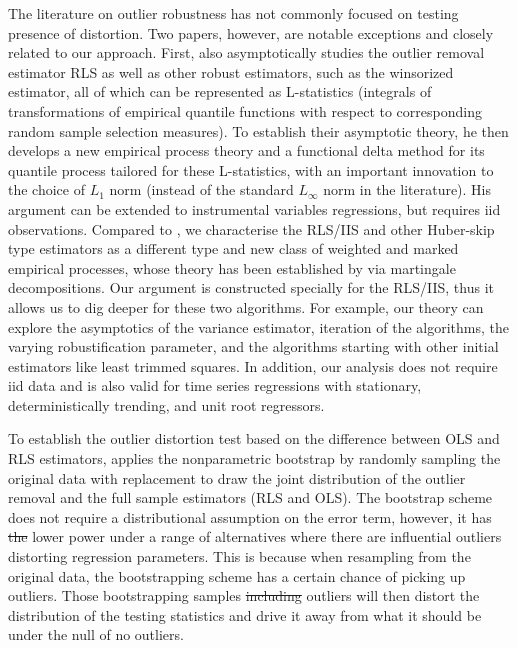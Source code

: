 \documentclass[11pt, letterpaper]{article}
\numberwithin{algorithm}{section}
\numberwithin{assumption}{section}
\numberwithin{lemma}{section}
\numberwithin{theorem}{section}
\numberwithin{corollary}{section}
\numberwithin{remark}{section}
\numberwithin{equation}{section}
\numberwithin{figure}{section}
\numberwithin{table}{section}
\providecommand{\DIFadd}[1]{{\protect\color{blue}\uwave{#1}}} %
\providecommand{\DIFdel}[1]{{\protect\color{red}\sout{#1}}}                      %
\providecommand{\DIFaddbegin}{} %
\providecommand{\DIFaddend}{} %
\providecommand{\DIFdelbegin}{} %
\providecommand{\DIFdelend}{} %
\newcommand{\DIFscaledelfig}{0.5}
\newlength{\DIFdelgraphicswidth} %
\newlength{\DIFdelgraphicsheight} %
\newcommand{\DIFaddincludegraphics}[2][]{{\color{blue}\fbox{\DIFOincludegraphics[#1]{#2}}}} %
\newcommand{\DIFdelincludegraphics}[2][]{%
\sbox{\DIFdelgraphicsbox}{\DIFOincludegraphics[#1]{#2}}%
\settoboxwidth{\DIFdelgraphicswidth}{\DIFdelgraphicsbox} %
\settoboxtotalheight{\DIFdelgraphicsheight}{\DIFdelgraphicsbox} %
\scalebox{\DIFscaledelfig}{%
\parbox[b]{\DIFdelgraphicswidth}{\usebox{\DIFdelgraphicsbox}\\[-\baselineskip] \rule{\DIFdelgraphicswidth}{0em}}\llap{\resizebox{\DIFdelgraphicswidth}{\DIFdelgraphicsheight}{%
\setlength{\unitlength}{\DIFdelgraphicswidth}%
\begin{picture}(1,1)%
\thicklines\linethickness{2pt} %
{\color[rgb]{1,0,0}\put(0,0){\framebox(1,1){}}}%
{\color[rgb]{1,0,0}\put(0,0){\line( 1,1){1}}}%
{\color[rgb]{1,0,0}\put(0,1){\line(1,-1){1}}}%
\end{picture}%
}\hspace*{3pt}}} %
} %
\DeclareRobustCommand{\DIFaddbegin}{\DIFOaddbegin \let\includegraphics\DIFaddincludegraphics} %
\DeclareRobustCommand{\DIFaddend}{\DIFOaddend \let\includegraphics\DIFOincludegraphics} %
\DeclareRobustCommand{\DIFdelbegin}{\DIFOdelbegin \let\includegraphics\DIFdelincludegraphics} %
\DeclareRobustCommand{\DIFdelend}{\DIFOaddend \let\includegraphics\DIFOincludegraphics} %
\begin{document}
The literature on outlier robustness has not commonly focused on testing presence of distortion. Two papers, however, are notable exceptions and closely related to our approach. First, \cite{kaji2018switching} also asymptotically studies the outlier removal estimator RLS as well as other robust estimators, such as the winsorized estimator, all of which can be represented as L-statistics (integrals of transformations of empirical quantile functions with respect to corresponding random sample selection measures). To establish their asymptotic theory, he then develops a new empirical process theory and a functional delta method for its quantile process tailored for these L-statistics, with an important innovation to the choice of $L_{1}$ norm (instead of the standard $L_{\infty}$ norm in the literature). His argument can be extended to instrumental variables regressions, but requires iid observations. Compared to \cite{kaji2018switching}, we characterise the RLS/IIS and other Huber-skip type estimators as a different type and new class of weighted and marked empirical processes, whose theory has been established by \cite{berenguer2019analysis} via martingale decompositions. Our argument is constructed specially for the RLS/IIS, thus it allows us to dig deeper for these two algorithms. For example, our theory can explore the asymptotics of the variance estimator, iteration of the algorithms, the varying robustification parameter, and the algorithms starting with other initial estimators like least trimmed squares. In addition, our analysis does not require iid data and is also valid for time series regressions with stationary, deterministically trending, and unit root regressors.

To establish the outlier distortion test based on the difference between OLS and RLS estimators, \cite{kaji2018switching} applies the nonparametric bootstrap by randomly sampling the original data with replacement to draw the joint distribution of the outlier removal and the full sample estimators (RLS and OLS). The bootstrap scheme does not require a distributional assumption on the error term, however, it has \DIFdelbegin \DIFdel{the }\DIFdelend lower power under a range of alternatives where there are influential outliers distorting regression parameters. This is because when resampling from the original data, the bootstrapping scheme has a certain chance of picking up outliers. Those bootstrapping samples \DIFdelbegin \DIFdel{including }\DIFdelend \DIFaddbegin \DIFadd{which inlucde }\DIFaddend outliers will then distort the distribution of the testing statistics and drive it away from what it should be under the null of no outliers.
\end{document}
